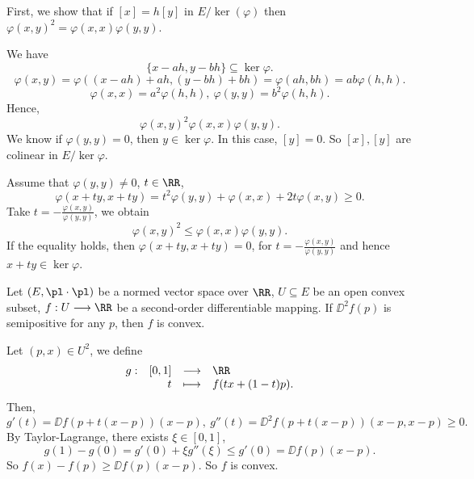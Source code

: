 \begin{proofenv}
    First, we show that if $[x]=h[y]$ in  $E/\ker(\varphi)$ then $\varphi(x,y)^2=\varphi(x,x)\varphi(y,y)$.

    We have 
    $$\{x-ah,y-bh\}\subseteq \ker \varphi.$$
    $$ \varphi(x,y)=\varphi((x-ah)+ah,(y-bh)+bh)=\varphi(ah,bh)=ab\varphi(h,h).$$
    $$ \varphi(x,x)=a^2\varphi(h,h),\ \varphi(y,y)=b^2\varphi(h,h).$$
    Hence, 
    $$ \varphi(x,y)^2\varphi(x,x)\varphi(y,y).$$
    We know if $\varphi(y,y)=0$, then $y\in \ker\varphi$. In this case, $[y]=0$. So $[x], [y]$ are colinear in $E/\ker \varphi$.

    Assume that $\varphi(y,y)\neq 0$, $t\in\RR$, 
    $$\varphi(x+ty,x+ty)=t^2 \varphi(y,y)+\varphi(x,x)+2t\varphi(x,y)\ge 0.$$
    Take $t=-\frac{\varphi(x,y)}{\varphi(y,y)}$, we obtain
    $$ \varphi(x,y)^2\le \varphi(x,x)\varphi(y,y).$$
    If the equality holds, then $\varphi(x+ty,x+ty)=0$, for $t=-\frac{\varphi(x,y)}{\varphi(y,y)}$ and hence $x+ty\in \ker\varphi$.
\end{proofenv}
\begin{theoremenv}
    Let $(E,\pl\cdot\pl)$ be a normed vector space over $\RR$, $U\subseteq E$ be an open convex subset, $f: U\longrightarrow \RR$ be a second-order differentiable mapping. If $\DD^2 f(p)$ is semipositive for any $p$, then $f$ is convex.
\end{theoremenv}
\begin{proofenv}
    Let $(p,x)\in U^2$, we define
    $$\begin{array}{rrcl}
        g: & [0,1]&\longrightarrow & \RR\\
        & t&\longmapsto & f(tx+(1-t)p).
    \end{array}$$
    Then, 
    $$g'(t)=\DD f(p+t(x-p))(x-p),\ g''(t)=\DD^2 f(p+t(x-p))(x-p,x-p)\ge 0.$$
    By Taylor-Lagrange, there exists $\xi\in [0,1]$,
    $$ g(1)-g(0)=g'(0)+\xi g''(\xi)\le g'(0)= \DD f(p)(x-p).$$
    So $f(x)-f(p)\ge \DD f(p)(x-p)$. So $f$ is convex.
\end{proofenv}

